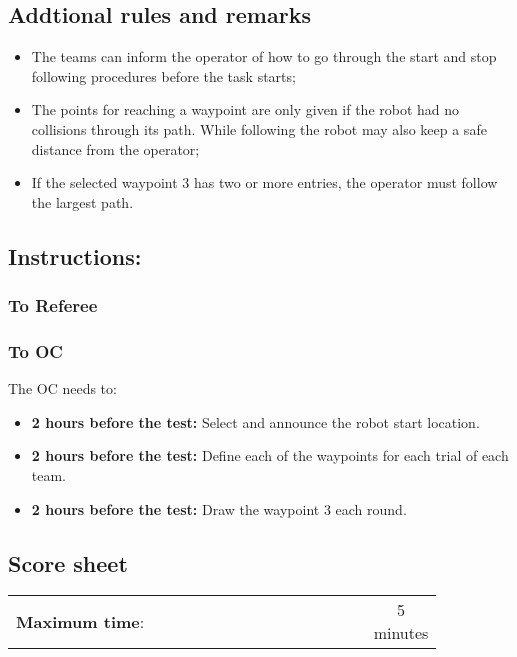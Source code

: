 \subsection*{Addtional rules and remarks}
\begin{itemize}[nosep]
	\item The teams can inform the operator of how to go through the start and stop following procedures before the task starts;
	\item The points for reaching a waypoint are only given if the robot had no collisions through its path. While following the robot may also keep a safe distance from the operator;
	\item If the selected waypoint 3 has two or more entries, the operator must follow the largest path.
\end{itemize}

\subsection*{Instructions:}
\subsubsection*{To Referee}


\subsubsection*{To OC}
The OC needs to:
\begin{itemize}
	\item \textbf{2 hours before the test:} Select and announce the robot start location.
	\item \textbf{2 hours before the test:} Define each of the waypoints for each trial of each team.
    \item \textbf{2 hours before the test:} Draw the waypoint 3 each round.
\end{itemize}

\newpage
\subsection*{Score sheet}

\begin{table}[h]
	\begin{tabular}{m{0.85\linewidth} c}
		\textbf{Maximum time}: & 5 minutes \\
	\end{tabular}
\end{table}

